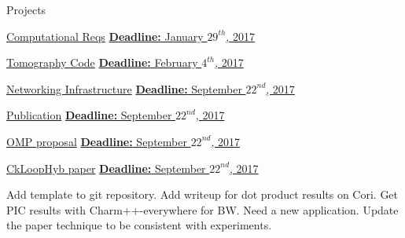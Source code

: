 \begin{columns}  %

\begin{column}{0.10\linewidth}

\begin{block}{Projects}




\underline{Computational Reqs} 
\underline{\textbf{Deadline:} January $29^{th}$, 2017} 
\begin{enumerate}
\pitem 
\pitem 
\end{enumerate}

\underline{Tomography Code} 
\underline{\textbf{Deadline:} February $4^{th}$, 2017} 
\begin{enumerate}
\pitem 
\pitem 
\end{enumerate}

\underline{Networking Infrastructure} 
\underline{\textbf{Deadline:} September $22^{nd}$, 2017} 
\begin{enumerate}
\pitem 
\pitem 
\end{enumerate}

\underline{Publication} 
\underline{\textbf{Deadline:} September $22^{nd}$, 2017} 
\begin{enumerate}
\pitem 
\pitem 
\end{enumerate}


\underline{OMP proposal} 
\underline{\textbf{Deadline:} September $22^{nd}$, 2017} 
\begin{enumerate}
\pitem 
\pitem 
\end{enumerate} 

\underline{CkLoopHyb paper}
\underline{\textbf{Deadline:} September $22^{nd}$, 2017}
\begin{enumerate}
\pitem Add template to git repository.
\pitem Add writeup for dot product results on Cori.
\pitem Get PIC results with Charm++-everywhere for BW.
\pitem Need a new application.
\ptask Update the paper technique to be consistent with experiments.


\end{enumerate}
\end{block}
\end{column}
\end{columns}
